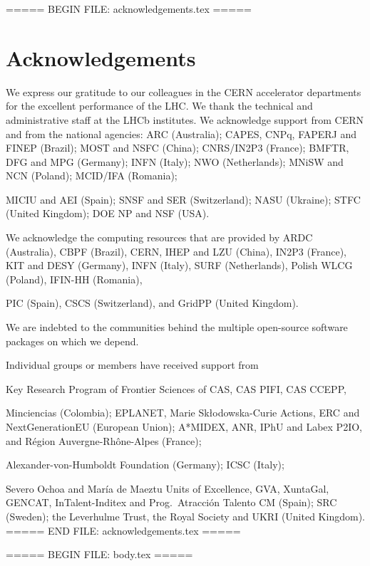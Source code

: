 ===== BEGIN FILE: acknowledgements.tex =====
\section*{Acknowledgements}



\noindent We express our gratitude to our colleagues in the CERN
accelerator departments for the excellent performance of the LHC. We
thank the technical and administrative staff at the LHCb
institutes.
We acknowledge support from CERN and from the national agencies:
ARC (Australia);
CAPES, CNPq, FAPERJ and FINEP (Brazil);
MOST and NSFC (China);
CNRS/IN2P3 (France);
BMFTR, DFG and MPG (Germany);
INFN (Italy);
NWO (Netherlands);
MNiSW and NCN (Poland);
MCID/IFA (Romania);

MICIU and AEI (Spain);
SNSF and SER (Switzerland);
NASU (Ukraine);
STFC (United Kingdom);
DOE NP and NSF (USA).

We acknowledge the computing resources that are provided by ARDC (Australia),
CBPF (Brazil),
CERN,
IHEP and LZU (China),
IN2P3 (France),
KIT and DESY (Germany),
INFN (Italy),
SURF (Netherlands),
Polish WLCG (Poland),
IFIN-HH (Romania),

PIC (Spain), CSCS (Switzerland),
and GridPP (United Kingdom).

We are indebted to the communities behind the multiple open-source
software packages on which we depend.

Individual groups or members have received support from

Key Research Program of Frontier Sciences of CAS, CAS PIFI, CAS CCEPP,


Minciencias (Colombia);
EPLANET, Marie Sk\l{}odowska-Curie Actions, ERC and NextGenerationEU (European Union);
A*MIDEX, ANR, IPhU and Labex P2IO, and R\'{e}gion Auvergne-Rh\^{o}ne-Alpes (France);

Alexander-von-Humboldt Foundation (Germany);
ICSC (Italy);

Severo Ochoa and Mar\'ia de Maeztu Units of Excellence, GVA, XuntaGal, GENCAT, InTalent-Inditex and Prog.~Atracci\'on Talento CM (Spain);
SRC (Sweden);
the Leverhulme Trust, the Royal Society and UKRI (United Kingdom).
===== END FILE: acknowledgements.tex =====

===== BEGIN FILE: body.tex =====



